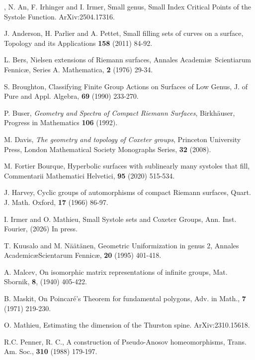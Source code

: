 \documentclass[12pt]{amsart}
\begin{document}
%

\begin{thebibliography}{}

, 
N. An, F. Irhinger and I. Irmer,
Small genus, Small Index  Critical Points of the Systole
Function. ArXiv:2504.17316.


 J. Anderson,  H. Parlier and A. Pettet,
Small filling sets of curves on a surface,
Topology and its Applications {\bf 158} (2011) 84-92.

 L. Bers, Nielsen extensions of Riemann surfaces,
Annales Academi\ae \ Scientiarum Fennic\ae, Series A. Mathematica, {\bf 2} (1976) 29-34.

 S. Broughton, Classifying Finite Group Actions on Surfaces of Low Genus, J. of Pure and Appl. Algebra,
{\bf 69} (1990) 233-270.


 P. Buser,  {\it Geometry and Spectra of Compact
Riemann Surfaces},  Birkh{\"a}user, 
Progress in Mathematics {\bf 106} (1992).

 M. Davis,
{\it The geometry and topology of {C}oxeter groups},
 Princeton University Press, London Mathematical Society Monographs Series, {\bf 32} (2008).
 
  M. Fortier Bourque, Hyperbolic surfaces with sublinearly many systoles that fill,
Commentarii Mathematici Helvetici, {\bf 95} (2020) 515-534.

 J. Harvey,
Cyclic groups of automorphisms of compact Riemann surfaces,
Quart. J. Math. Oxford,  {\bf 17}  (1966) 86-97.

 I. Irmer and O. Mathieu, 
Small Systole sets and  Coxeter Groups,
Ann. Inst. Fourier, (2026) In press.

 T. Kuusalo and M. N\"a\"at\"anen,
Geometric Uniformization in genus 2,
Annales Academic\ae Scientarum Fennic\ae,
{\bf 20} (1995) 401-418.

  A. Malcev, On isomorphic matrix representations of infinite groups,
Mat. Sbornik, {\bf 8}, (1940) 405-422.

 B. Maskit, On Poincar\'e's Theorem for fundamental polygons, Adv. in Math., {\bf 7} (1971) 219-230.

O. Mathieu, Estimating the dimension of the Thurston spine.
ArXiv:2310.15618.

R.C. Penner, R. C., A construction of Pseudo-Anosov homeomorphisms, Trans. Am. Soc., {\bf 310} (1988) 179-197.


\end{thebibliography}
\end{document}
